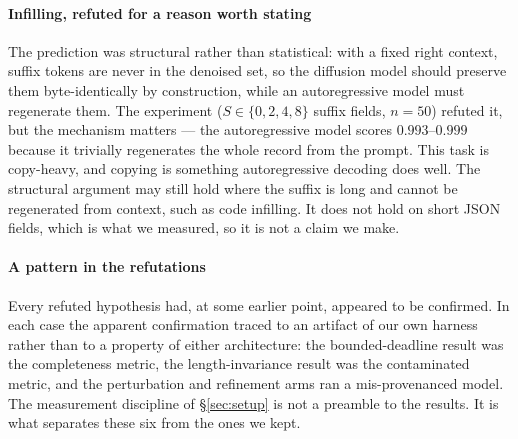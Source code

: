 \paragraph{Infilling, refuted for a reason worth stating}
The prediction was structural rather than statistical: with a fixed right
context, suffix tokens are never in the denoised set, so the diffusion model
should preserve them byte-identically by construction, while an autoregressive
model must regenerate them. The experiment ($S \in \{0,2,4,8\}$ suffix fields,
$n{=}50$) refuted it, but the mechanism matters --- the autoregressive model
scores $0.993$--$0.999$ because it trivially regenerates the whole record from
the prompt. This task is copy-heavy, and copying is something autoregressive
decoding does well. The structural argument may still hold where the suffix is
long and cannot be regenerated from context, such as code infilling. It does
not hold on short JSON fields, which is what we measured, so it is not a claim
we make.

\paragraph{A pattern in the refutations}
Every refuted hypothesis had, at some earlier point, appeared to be confirmed.
In each case the apparent confirmation traced to an artifact of our own
harness rather than to a property of either architecture: the bounded-deadline
result was the completeness metric, the length-invariance result was the
contaminated metric, and the perturbation and refinement arms ran a
mis-provenanced model. The measurement discipline of \S\ref{sec:setup} is not
a preamble to the results. It is what separates these six from the ones we
kept.
